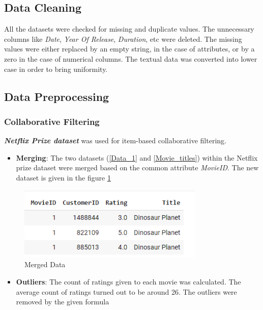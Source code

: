 \documentclass[a4paper,10pt]{article}
\begin{document}
\subsection{Data Cleaning}

All the datasets were checked for missing and duplicate values. 
The unnecessary columns like \textit{Date}, \textit{Year Of Release}, \textit{Duration}, etc were deleted. The missing values were either replaced by an empty string, in the case of attributes, or by a zero in the case of numerical columns.  
The textual data was converted into lower case in order to bring uniformity.

\subsection{Data Preprocessing}

\subsubsection{Collaborative Filtering}
\textit{\textbf{Netflix Prize dataset}} was used for item-based collaborative filtering. 
\begin{itemize}
    \item \textbf{Merging}: The two datasets (\ref{Data_1} and \ref{Movie_titles}) within the Netflix prize dataset were merged based on the common attribute \textit{MovieID}. The new dataset is given in the figure \ref{Movie_merge}
\end{itemize}

\begin{figure}[H]
\centering
\includegraphics[height=3.5cm]{figures/movie_data.png}
\caption{Merged Data}
\label{Movie_merge}
\end{figure}


\begin{itemize}
    \item \textbf{Outliers}: The count of ratings given to each movie was calculated. The average count of ratings turned out to be around 26. The outliers were removed by the given formula 
\end{itemize}
\end{document}

